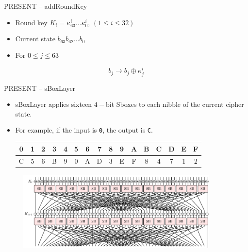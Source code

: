 \begin{frame}{PRESENT -- addRoundKey}
    \begin{itemize}
        \item Round key $K_i=\kappa^i_{63}\dots\kappa_0^i$, $(1\leq i\leq 32)$
        \item Current state $b_{63}b_{62}\dots b_0$
        \item For $0\leq j\leq 63$
    \end{itemize}
    \[
b_j\to b_j\oplus\kappa_j^i
\]
\end{frame}

\begin{frame}{PRESENT -- sBoxLayer}
    \begin{itemize}
        \item sBoxLayer applies sixteen $4-$bit Sboxes to each nibble of the current cipher state.
        \item For example, if the input is \texttt{0}, the output is \texttt{C}.
\begin{table}[htb]
\centering
\ttfamily
\begin{tabular}{cccccccccccccccc}\hline
 0 & 1 & 2 & 3 & 4 & 5 & 6 & 7 & 8 & 9 & A & B & C & D & E & F \\\hline
 C & 5 & 6 & B & 9 & 0 & A & D & 3 & E & F & 8 & 4 & 7 & 1 & 2\\\hline
\end{tabular}
\end{table}
    \end{itemize}
\begin{figure}
    \centering
    \includegraphics[width=0.9\textwidth]{fig/PRESENT_two_rounds.pdf}
\end{figure}
\end{frame}


